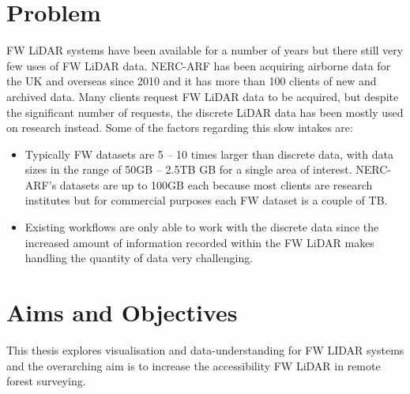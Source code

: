 \documentclass{subfiles}
\begin{document}
\section{Problem}\label{sec:Problem}
\par FW LiDAR systems have been available for a number of years but there still very few uses of FW LiDAR data. NERC-ARF has been acquiring airborne data for the UK and overseas since 2010 and it has more than 100 clients of new and archived data. Many clients request FW LiDAR data to be acquired, but despite the significant number of requests, the discrete LiDAR data has been mostly used on research instead. Some of the factors regarding this slow intakes are:
\begin{itemize}
	\item Typically FW datasets are 5 – 10 times larger than discrete data, with data sizes in the range of 50GB – 2.5TB GB for a single area of interest. NERC-ARF's datasets are up to 100GB each because most clients are research institutes but for commercial purposes each FW dataset is a couple of TB.
	\item Existing workflows are only able to work with the discrete data since the increased amount of information recorded within the FW LiDAR makes handling the quantity of data very challenging.
\end{itemize}

\section {Aims and Objectives}

\par This thesis explores visualisation and data-understanding for FW LIDAR systems and the overarching aim is to increase the accessibility FW LiDAR in remote forest surveying.
\end{document}

